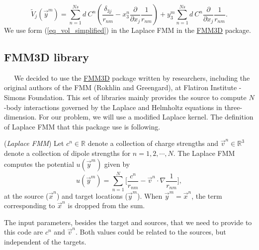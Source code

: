 \begin{equation}
	\tilde{V}_j (\vec{y}^m) 
	=
		\sum_{n=1}^{Ns} 
		d \ {C}^n
		\left(
			\frac{ \delta_{3j} }{r_{nm}}
			- 
			 x_3^n  
			\frac{\partial}{\partial x_j}
				\frac{1}{r_{nm}}
				\right)
			+
			   y_3^m  
			\sum_{n=1}^{Ns} 
			d \ {C}^n
			\frac{\partial}{\partial x_j}
				\frac{1}{r_{nm}}.
\label{eq_vol_simplified}
\end{equation}
%
We use form (\ref{eq_vol_simplified}) in the Laplace FMM in the \href{https://github.com/flatironinstitute/FMM3D}{FMM3D} package.
%
%
\subsection{FMM3D library}
$\ \ \ \ \ $  
We decided to use the \href{https://github.com/flatironinstitute/FMM3D}{FMM3D} package written by researchers, including the original authors of the FMM (Rokhlin and Greengard), at Flatiron Institute - Simons Foundation. This set of  libraries mainly provides the source to compute $N$-body interactions governed by the Laplace and Helmholtz equations in three-dimension. For our problem, we will use a modified Laplace kernel.
The definition of Laplace FMM that this package use is following.
\begin{definition} (\textit{Laplace FMM})
	Let $c^n \in \mathbb{R}$ denote a collection of charge strengths and $\vec{v}^n \in \mathbb{R}^3$ denote a collection of dipole strengths for $n = 1,2, \cdots, N$.
	The Laplace FMM computes the potential $u(\vec{y}^m)$ given by
\begin{equation}
	u(\vec{y}^m) = \sum_{n = 1}^{N} 
		\Biggl[
		\frac{c^n}{r_{nm}}
			- \vec{v}^n \cdot \nabla 
			 \frac{1}{r_{nm}}
		\Biggr],
\label{eq_fmm3d_package}
\end{equation}
	at the source ($\vec{x}^n$) and target locations ($\vec{y}^m$).
	When $\vec{y}^m = \vec{x}^n$, the term corresponding to $\vec{x}^n$
	is dropped from the sum.
\end{definition}
The input parameters, besides the target and sources, that we need to provide to this code are $c^n$ and $\vec{v}^n$. Both values could be related to the sources, but independent of the targets.
